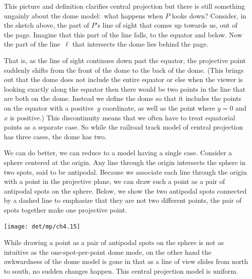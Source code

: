 This picture and definition
clarifies central projection
but there is still something ungainly about the dome 
model:~what happens when $P$ looks down?
Consider, in the sketch above, the part of $P$'s line of sight 
that comes up towards us, out of the page.
Imagine that this part of the line falls, to the equator and
below.
Now the part of the line~$\ell$ that intersects the dome lies behind the page.  

That is, as
the line of sight continues down past the equator, the projective point
suddenly shifts from the front of the dome to the back of the dome.
(This brings out that the dome does not include the entire equator
or else
when the viewer is looking exactly along the equator then there would be 
two points in the line that are both on the dome. 
Instead we define the dome so that it includes the
points on the equator with a positive~$y$ coordinate, as well as the point
where $y=0$ and $x$ is positive.)
This discontinuity means that
we often have to treat equatorial points as a separate case.
So while the railroad track model of central projection
has three cases, the dome has two.

We can do better, we can reduce to a model having a single case.
Consider a sphere centered at the origin.
Any line through the origin intersects the sphere in two spots, said to be
antipodal.
Because we associate each line through the origin 
with a point in the projective 
plane, we can draw such a point as a pair of antipodal spots on the sphere. 
Below, we show the two antipodal spots connected by a dashed line
to emphasize that they are not two 
different points, the pair of spots together make one projective point.
\begin{center}
  \texttt{[image: det/mp/ch4.15]}
\end{center}
While drawing a point as a pair of antipodal 
spots on the sphere is not as intuitive as the one-spot-per-point dome mode,
on the other hand
the awkwardness of the dome model is gone in that 
as a line of view slides from north to south, 
no sudden changes happen.
This central projection model is uniform.

